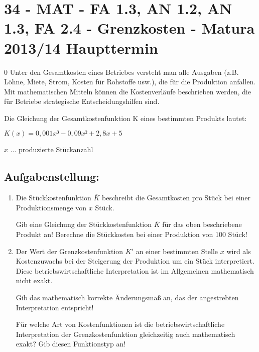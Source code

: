 \section{34 - MAT - FA 1.3, AN 1.2, AN 1.3, FA 2.4  - Grenzkosten - Matura 2013/14 Haupttermin}

\begin{langesbeispiel} \item[0] %
				Unter den Gesamtkosten eines Betriebes versteht man alle Ausgaben (z.B. Löhne, Miete, Strom, Kosten für Rohstoffe usw.), die für die Produktion anfallen. Mit mathematischen Mitteln können die Kostenverläufe beschrieben werden, die für Betriebe strategische Entscheidungshilfen sind.
				
Die Gleichung der Gesamtkostenfunktion K eines bestimmten Produkts lautet: 

$K(x)=0,001x³-0,09x²+2,8x+5$

$x$ ... produzierte Stückanzahl


\subsection{Aufgabenstellung:}
\begin{enumerate}
	\item  Die Stückkostenfunktion $\overline{K}$ beschreibt die Gesamtkosten pro Stück bei einer Produktionsmenge von $x$ Stück.
	
	 Gib eine Gleichung der Stückkostenfunktion $\overline{K}$ für das oben beschriebene Produkt an! Berechne die Stückkosten bei einer Produktion von 100 Stück!

 
\item  Der Wert der Grenzkostenfunktion $K'$ an einer bestimmten Stelle $x$ wird als Kostenzuwachs bei der Steigerung der Produktion um ein Stück interpretiert. Diese betriebswirtschaftliche Interpretation ist im Allgemeinen mathematisch nicht exakt. 

Gib das mathematisch korrekte Änderungsmaß an, das der angestrebten Interpretation entspricht! 

Für welche Art von Kostenfunktionen ist die betriebswirtschaftliche Interpretation der Grenzkostenfunktion gleichzeitig auch mathematisch exakt? Gib diesen Funktionstyp an!

						\end{enumerate}\leer
				
\end{langesbeispiel}
